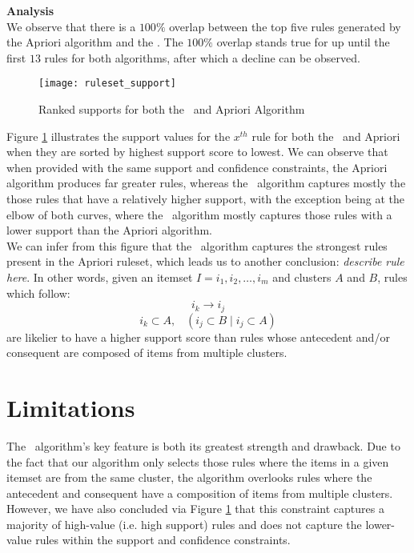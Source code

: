 \noindent \textbf{Analysis}\\
We observe that there is a $100\%$ overlap between the top five rules generated by the Apriori algorithm and the \algo. The $100\%$ overlap stands true for up until the first $13$ rules for both algorithms, after which a decline can be observed. 
\begin{figure}[H]
\centering
\texttt{[image: ruleset\_support]}
\caption{Ranked supports for both the \algo\ and Apriori Algorithm}
\label{fig:rule_support}
\end{figure}
Figure \ref{fig:rule_support} illustrates the support values for the $x^{th}$ rule for both the \algo\ and Apriori when they are sorted by highest support score to lowest. 
We can observe that when provided with the same support and confidence constraints, the Apriori algorithm produces far greater rules, whereas the \algo\ algorithm captures mostly the those rules that have a relatively higher support, with the exception being at the elbow of both curves, where the \algo\ algorithm mostly captures those rules with a lower support than the Apriori algorithm.\\
We can infer from this figure that the \algo\ algorithm captures the strongest rules present in the Apriori ruleset, which leads us to another conclusion: \textit{describe rule here}. In other words, given an itemset $I = i_1,i_2,\dots,i_m$ and clusters $A$ and $B$, rules which follow:
\[
i_k \rightarrow i_j
\]
\[
i_k \subset A, \;\;\; (i_j \subset B \;|\; i_j \subset A)
\]
are likelier to have a higher support score than rules whose antecedent and/or consequent are composed of items from multiple clusters.


\section{Limitations}
The \algo\ algorithm's key feature is both its greatest strength and drawback. Due to the fact that our algorithm only selects those rules where the items in a given itemset are from the same cluster, the algorithm overlooks rules where the antecedent and consequent have a composition of items from multiple clusters. However, we have also concluded via Figure \ref{fig:rule_support} that this constraint captures a majority of high-value (i.e. high support) rules and does not capture the lower-value rules within the support and confidence constraints.
